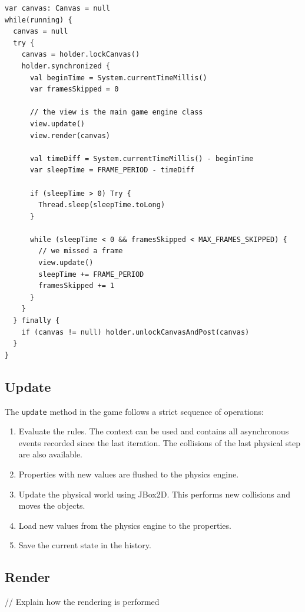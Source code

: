 \documentclass[11pt,a4paper]{article}
\begin{document}
\begin{lstlisting}
var canvas: Canvas = null
while(running) {
  canvas = null
  try {
    canvas = holder.lockCanvas()
    holder.synchronized {
      val beginTime = System.currentTimeMillis()
      var framesSkipped = 0

      // the view is the main game engine class
      view.update()
      view.render(canvas)

      val timeDiff = System.currentTimeMillis() - beginTime
      var sleepTime = FRAME_PERIOD - timeDiff

      if (sleepTime > 0) Try {
        Thread.sleep(sleepTime.toLong)
      }

      while (sleepTime < 0 && framesSkipped < MAX_FRAMES_SKIPPED) {
        // we missed a frame
        view.update()
        sleepTime += FRAME_PERIOD
        framesSkipped += 1
      }
    }
  } finally {
    if (canvas != null) holder.unlockCanvasAndPost(canvas)
  }
}
\end{lstlisting}


\subsection{Update}
The \texttt{update} method in the game follows a strict sequence of operations:
\begin{enumerate}
\item Evaluate the rules. The context can be used and contains all asynchronous events recorded since the last iteration. The collisions of the last physical step are also available.
\item Properties with new values are flushed to the physics engine.
\item Update the physical world using JBox2D. This performs new collisions and moves the objects.
\item Load new values from the physics engine to the properties.
\item Save the current state in the history.
\end{enumerate}

\subsection{Render}

// Explain how the rendering is performed
\end{document}
